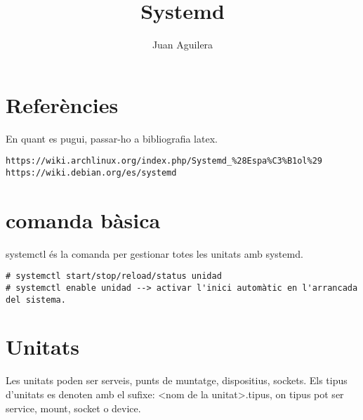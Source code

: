 \documentclass[a4paper]{article}
\begin{document}
\title{Systemd}
\author{Juan Aguilera}
\maketitle

\section{Referències}
En quant es pugui, passar-ho a bibliografia latex.
\begin{verbatim}
https://wiki.archlinux.org/index.php/Systemd_%28Espa%C3%B1ol%29
https://wiki.debian.org/es/systemd
\end{verbatim}
\section{comanda bàsica}
systemctl és la comanda per gestionar totes les unitats amb systemd.

\begin{verbatim}
# systemctl start/stop/reload/status unidad
# systemctl enable unidad --> activar l'inici automàtic en l'arrancada del sistema.
\end{verbatim}
\section{Unitats}

Les unitats poden ser serveis, punts de muntatge, dispositius, sockets. Els tipus d'unitats es denoten amb el sufixe: <nom de la unitat>.tipus, on tipus pot ser service, mount, socket o device.
\end{document}
